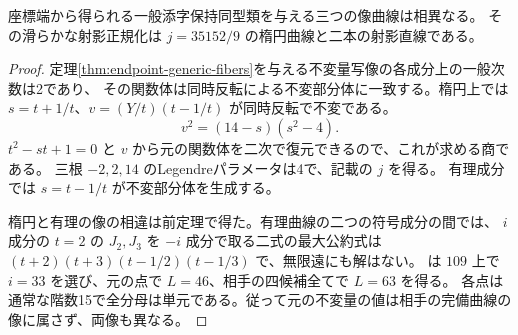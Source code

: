 \begin{proposition}\label{prop:endpoint-moduli-normalizations}
座標端から得られる一般添字保持同型類を与える三つの像曲線は相異なる。
その滑らかな射影正規化は $j=35152/9$ の楕円曲線と二本の射影直線である。
\end{proposition}
\begin{proof}
定理\ref{thm:endpoint-generic-fibers}を与える不変量写像の各成分上の一般次数は2であり、
その関数体は同時反転による不変部分体に一致する。楕円上では
$s=t+1/t$、$v=(Y/t)(t-1/t)$ が同時反転で不変である。
\[
 v^2=(14-s)(s^2-4).
\]
$t^2-st+1=0$ と $v$ から元の関数体を二次で復元できるので、これが求める商である。
三根 $-2,2,14$ のLegendreパラメータは4で、記載の $j$ を得る。
有理成分では $s=t-1/t$ が不変部分体を生成する。

楕円と有理の像の相違は前定理で得た。有理曲線の二つの符号成分の間では、
$i$ 成分の $t=2$ の $J_2,J_3$ を $-i$ 成分で取る二式の最大公約式は
$(t+2)(t+3)(t-1/2)(t-1/3)$ で、無限遠にも解はない。
 は
$109$ 上で $i=33$ を選び、元の点で $L=46$、相手の四候補全てで $L=63$ を得る。
各点は通常な階数15で全分母は単元である。従って元の不変量の値は相手の完備曲線の
像に属さず、両像も異なる。
\end{proof}
